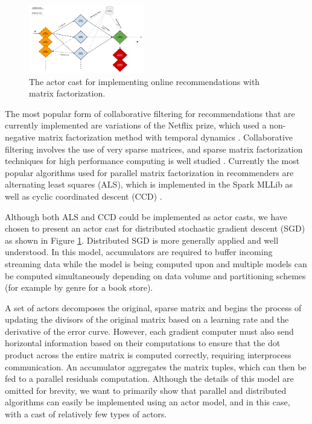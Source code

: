 \documentclass[conference,twocolumn,11pt]{IEEEtran}
\begin{document}
\begin{figure}[!h]
    \centering
    \includegraphics[width=0.45\textwidth]{nnmf_cast}
    \caption{The actor cast for implementing online recommendations with matrix factorization.}
    \label{fig:nnmf_cast}
\end{figure}

The most popular form of collaborative filtering for recommendations that are currently implemented are variations of the Netflix prize, which used a non-negative matrix factorization method with temporal dynamics \cite{koren_collaborative_2010}. Collaborative filtering involves the use of very sparse matrices, and sparse matrix factorization techniques for high performance computing is well studied \cite{gupta_highly_1997}. Currently the most popular algorithms used for parallel matrix factorization in recommenders are alternating least squares (ALS), which is implemented in the Spark MLLib as well as cyclic coordinated descent (CCD) \cite{yu_scalable_2012}.

Although both ALS and CCD could be implemented as actor casts, we have chosen to present an actor cast for distributed stochastic gradient descent (SGD) \cite{gemulla_large-scale_2011} as shown in Figure \ref{fig:nnmf_cast}. Distributed SGD is more generally applied and well understood. In this model, accumulators are required to buffer incoming streaming data while the model is being computed upon and multiple models can be computed simultaneously depending on data volume and partitioning schemes (for example by genre for a book store).

A set of actors decomposes the original, sparse matrix and begins the process of updating the divisors of the original matrix based on a learning rate and the derivative of the error curve. However, each gradient computer must also send horizontal information based on their computations to ensure that the dot product across the entire matrix is computed correctly, requiring interprocess communication. An accumulator aggregates the matrix tuples, which can then be fed to a parallel residuals computation. Although the details of this model are omitted for brevity, we want to primarily show that parallel and distributed algorithms can easily be implemented using an actor model, and in this case, with a cast of relatively few types of actors.
\end{document}
